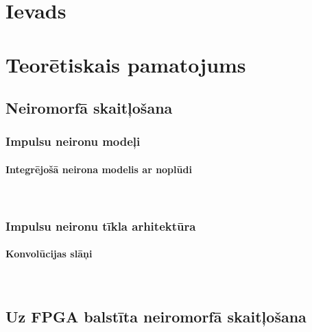 \documentclass[a4paper, 12pt]{article}
\begin{document}

\setcounter{page}{2}




% 


\cleardoublepage
{}
\printglossary[type=\acronymtype, title=SAĪSINĀJUMI]

\tableofcontents
\clearpage

\section{Ievads}


\section{Teorētiskais pamatojums}
  \subsection{Neiromorfā skaitļošana} %

    \subsubsection{Impulsu neironu modeļi} %
      \paragraph{Integrējošā neirona modelis ar noplūdi}\mbox{} \\
      

    \subsubsection{Impulsu neironu tīkla arhitektūra} %
      \paragraph{Konvolūcijas slāņi}\mbox{} \\
      
  \subsection{Uz FPGA balstīta neiromorfā skaitļošana}
\end{document}
